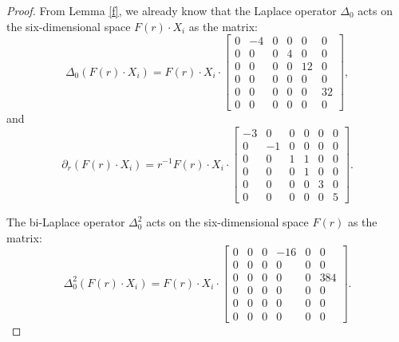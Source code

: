 \documentclass[10pt,a4paper]{amsart}
\begin{document}
\begin{proof}
    From Lemma \ref{f}, we already know that 
    the Laplace operator $\Delta_0$ acts on the six-dimensional space $F(r)\cdot X_i$ as the matrix:
\begin{equation}
    \Delta_0(F(r)\cdot X_i)=F(r)\cdot X_i\cdot 
    \begin{bmatrix}
0 & -4 & 0 & 0 & 0& 0\\
0 & 0 & 0 & 4 & 0& 0\\
0 & 0 & 0 & 0 & 12& 0\\
0 & 0 & 0 & 0 & 0& 0\\
0 & 0 & 0 & 0 & 0& 32\\
0 & 0 & 0 & 0 & 0& 0
\end{bmatrix},
\end{equation}
and
\begin{equation*}
        \partial_r \left(F(r)\cdot X_i\right)=r^{-1}F(r)\cdot X_i\cdot\begin{bmatrix}
-3 & 0 & 0 & 0 & 0& 0\\
0 & -1 & 0 & 0 & 0& 0\\
0 & 0 & 1 & 1 & 0& 0\\
0 & 0 & 0 & 1 & 0& 0\\
0 & 0 & 0 & 0 & 3& 0\\
0 & 0 & 0 & 0 & 0& 5
        \end{bmatrix}.
    \end{equation*}

The bi-Laplace operator $\Delta^2_0$ acts on the six-dimensional space $F(r)$ as the matrix:
\begin{equation}
    \Delta^2_0(F(r)\cdot X_i)=F(r)\cdot X_i\cdot 
    \begin{bmatrix}
0 & 0 & 0 & -16 & 0& 0\\
0 & 0 & 0 & 0 & 0& 0\\
0 & 0 & 0 & 0 & 0& 384\\
0 & 0 & 0 & 0 & 0& 0\\
0 & 0 & 0 & 0 & 0& 0\\
0 & 0 & 0 & 0 & 0& 0
\end{bmatrix}.
\end{equation}


\end{proof}
\end{document}
